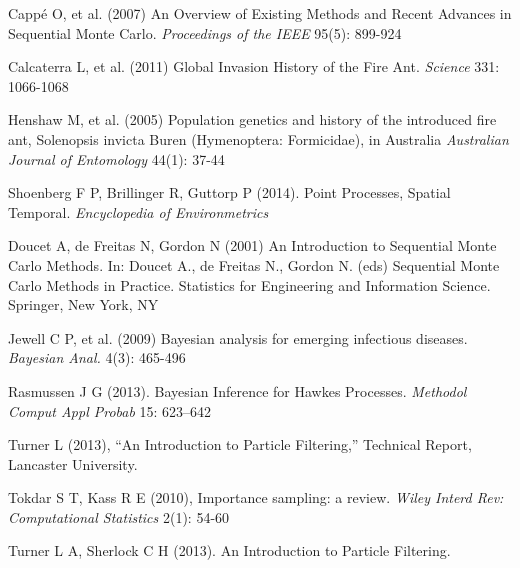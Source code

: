\documentclass[11pt,a4paper]{article}
\begin{document}
\begin{thebibliography}{99}
 Capp\'{e} O, et al. (2007) An Overview of Existing Methods and Recent Advances in Sequential Monte Carlo. \textit{Proceedings of the IEEE} 95(5): 899-924

 Calcaterra L, et al. (2011) Global Invasion History of the Fire Ant. \textit{Science} 331: 1066-1068

 Henshaw M, et al. (2005) Population genetics and history of the introduced fire ant, Solenopsis invicta Buren (Hymenoptera: Formicidae), in Australia \textit{Australian Journal of Entomology} 44(1): 37-44

 Shoenberg F P, Brillinger R, Guttorp P (2014). Point Processes, Spatial Temporal. \textit{Encyclopedia of Environmetrics}


 Doucet A, de Freitas N, Gordon N (2001) An Introduction to Sequential Monte Carlo Methods. In: Doucet A., de Freitas N., Gordon N. (eds) Sequential Monte Carlo Methods in Practice. Statistics for Engineering and Information Science. Springer, New York, NY

 Jewell C P, et al. (2009) Bayesian analysis for emerging infectious diseases. \textit{Bayesian Anal.} 4(3): 465-496

 Rasmussen J G (2013). Bayesian Inference for Hawkes Processes. \textit{Methodol Comput Appl Probab} 15: 623–642


 Turner L (2013), “An Introduction to Particle Filtering,” Technical Report, Lancaster University.


 Tokdar S T, Kass R E (2010), Importance sampling: a review. \textit{Wiley Interd Rev: Computational Statistics} 2(1): 54-60

 Turner L A, Sherlock C H (2013). An Introduction to Particle Filtering.


\end{thebibliography}
\end{document}
